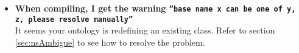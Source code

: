 \begin{itemize}
	\item \textbf{When compiling, I get the warning \texttt{''base name x can be one of y, z, please resolve manually''}}\\
	It seems your ontology is redefining an existing class. Refer to section \ref{sec:nsAmbigue} to see how to resolve the problem.

\end{itemize}
